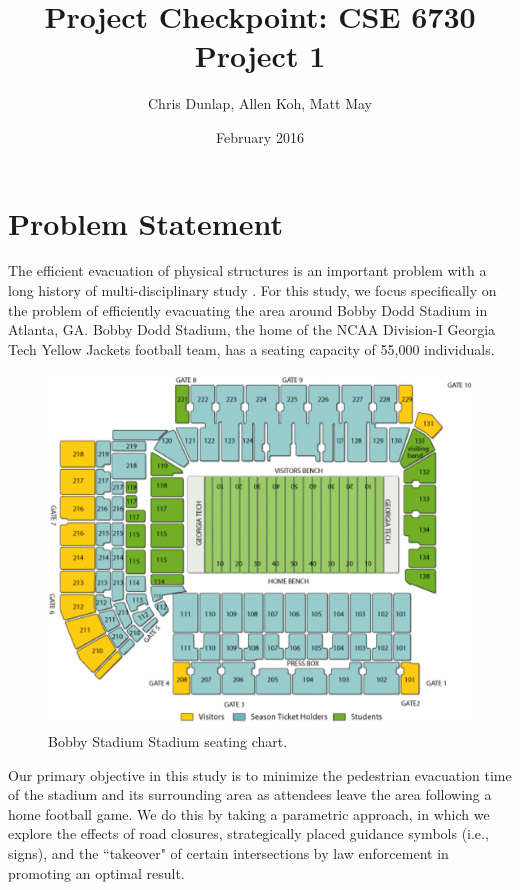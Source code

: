 \documentclass[12pt]{article}
\title{Project Checkpoint: CSE 6730 Project 1}
\author{Chris Dunlap, Allen Koh, Matt May}
\date{February 2016}
\begin{document}
\begin{titlepage}
\maketitle
\thispagestyle{empty}
\end{titlepage}

\section{Problem Statement}
\label{sec:problem}

The efficient evacuation of physical structures is an important problem with a
long history of multi-disciplinary study \cite{zheng2009modeling}. For this
study, we focus specifically on the problem of efficiently evacuating the
area around Bobby Dodd Stadium in Atlanta, GA. Bobby Dodd Stadium, the home of
the NCAA Division-I Georgia Tech Yellow Jackets football team, has a
seating capacity of 55,000 individuals.

\begin{figure}[H]
  \includegraphics[width=\linewidth,natwidth=521,natheight=435]{stadium_diagram_updated.png}
  \caption{Bobby Stadium Stadium seating chart.}
  \label{fig:polygon}
\end{figure}

Our primary objective in this study is to minimize the pedestrian evacuation
time of the stadium and its surrounding area as attendees leave the area
following a home football game. We do this by taking a parametric approach, in
which we explore the effects of road closures, strategically placed guidance
symbols (i.e., signs), and the ``takeover" of certain intersections by law
enforcement in promoting an optimal result.
\end{document}
